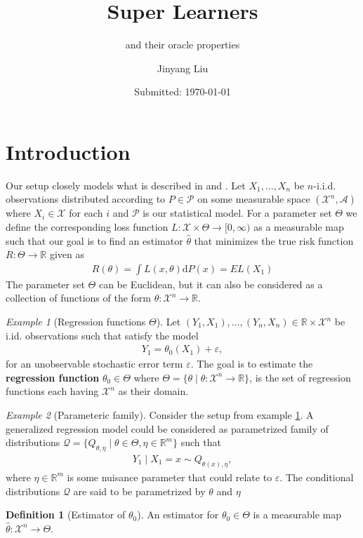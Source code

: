 \documentclass[11pt, a4paper]{article}
\author{Jinyang Liu}
\title{Super Learners}
\subtitle{and their oracle properties}
\date{Submitted: \today}
\theoremstyle{definition}
\newtheorem{definition}[theorem]{Definition}
\theoremstyle{remark}
\newtheorem{example}{Example}
\begin{document}
\begingroup
    \selectfont
    \maketitle
    \tableofcontents
    \newpage
\endgroup


\section{Introduction}
Our setup closely models what is described in \cite{vaart06} and \cite{laan03}. 
Let $ X_1, ..., X_n $ be $ n $-i.i.d. observations distributed according to $ P \in \mathcal{P} $ on some measurable space $ (\mathcal{X}^{n}, \mathcal{A}) $ where $ X_{i} \in \mathcal{X} $ for each $ i $ and $ \mathcal{P} $ is our statistical model. For a parameter set $ \Theta $ we define the corresponding loss function $ L : \mathcal{X} \times \Theta \to [0, \infty) $ as a measurable map such that our goal is to find an estimator $ \hat{\theta}  $ that minimizes the true risk function $ R: \Theta \to \mathbb{R} $ given as
\begin{align*}
    R(\theta) = \int L(x, \theta)  \mathrm{d}P(x) = EL(X_1) 
\end{align*}
The parameter set $ \Theta $ can be Euclidean, but it can also be considered as a collection of functions of the form $ \theta : \mathcal{X}^{n} \to \mathbb{R} $. 

\begin{example}[Regression functions $ \Theta $] \label{ex:regfunc}
    Let $ (Y_1 , X_1) ,..., (Y_n , X_n) \in \mathbb{R} \times \mathcal{X}^{n} $ be i.id. observations such that satisfy the model 
    \begin{align*}
        Y_1 = \theta_0(X_1) + \varepsilon,
    \end{align*}
    for an unobservable stochastic error term $ \varepsilon $. The goal is to estimate the \textbf{regression function} $ \theta_0 \in \Theta $ where $ \Theta = \{\theta \mid \theta : \mathcal{X}^{n} \to \mathbb{R}\}$, is the set of regression functions each having $ \mathcal{X}^{n} $ as their domain. \cite{vaart06}
\end{example}

\begin{example}[Parameteric family] \label{ex:parametricfam}
    Consider the setup from example \ref{ex:regfunc}. A generalized regression model could be considered as parametrized family of distributions $ \mathcal{Q} = \{Q_{\theta, \eta} \mid \theta \in \Theta , \eta \in \mathbb{R}^{m} \} $ such that
    \begin{align*}
        Y_1 \mid X_1 = x \sim Q_{\theta(x) , \eta},
    \end{align*}
    where $ \eta \in \mathbb{R}^{m} $ is some nuisance parameter that could relate to $ \varepsilon $. The conditional distributions $ \mathcal{Q} $ are said to be parametrized by $ \theta $ and $ \eta $ \cite{bickel1993efficient}
\end{example}
\begin{definition}[Estimator of $ \theta_0 $]
    An estimator for $ \theta_0 \in \Theta $ is a measurable map $ \hat{\theta} : \mathcal{X}^{n} \to \Theta  $.
\end{definition}
\end{document}
